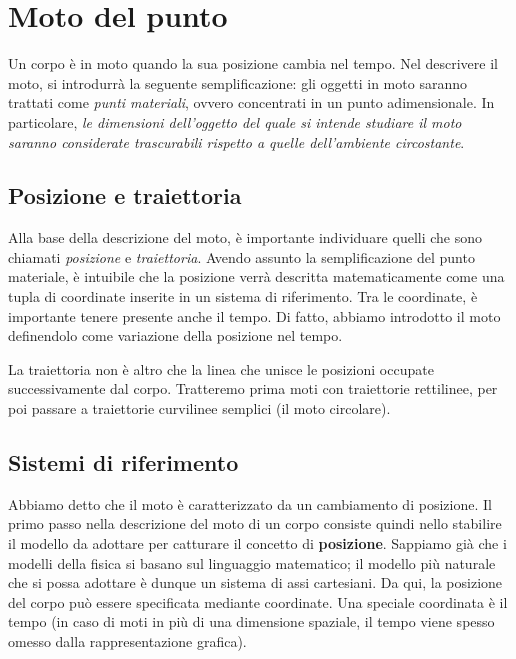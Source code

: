 \marginpar{\minitoc}

\section{Moto del punto}
Un corpo è in moto quando la sua posizione cambia nel tempo. Nel descrivere il
moto, si introdurrà la seguente semplificazione: gli oggetti in moto saranno
trattati come \textit{punti materiali}, ovvero concentrati in un punto
adimensionale. In particolare, \textit{le dimensioni dell'oggetto del quale si
intende studiare il moto saranno considerate trascurabili rispetto a quelle
dell'ambiente circostante}.

\subsection{Posizione e traiettoria}
Alla base della descrizione del moto, è importante individuare quelli che sono
chiamati \textit{posizione} e \textit{traiettoria}. Avendo assunto la semplificazione
del punto materiale, è intuibile che la posizione verrà descritta matematicamente
come una tupla di coordinate inserite in un sistema di riferimento. Tra le
coordinate, è importante tenere presente anche il tempo. Di fatto, abbiamo
introdotto il moto definendolo come variazione della posizione nel tempo.

La traiettoria non è altro che la linea che unisce le posizioni occupate
successivamente dal corpo. Tratteremo prima moti con traiettorie rettilinee,
per poi passare a traiettorie curvilinee semplici (il moto circolare).

\subsection{Sistemi di riferimento}
Abbiamo detto che il moto è caratterizzato da un cambiamento di posizione. Il primo
passo nella descrizione del moto di un corpo consiste quindi nello stabilire il
modello da adottare per catturare il concetto di \textbf{posizione}. Sappiamo già
che i modelli della fisica si basano sul linguaggio matematico; il modello più
naturale che si possa adottare è dunque un sistema di assi cartesiani. Da qui, la
posizione del corpo può essere specificata mediante coordinate. Una speciale
coordinata è il tempo (in caso di moti in più di una dimensione spaziale, il
tempo viene spesso omesso dalla rappresentazione grafica).

